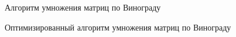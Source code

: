 \documentclass[12pt]{report}
\begin{document}
\newpage
\begin{figure}[h]
	\caption{Алгоритм умножения матриц по Винограду}
	\label{figure:image}
\end{figure}

\newpage
\begin{figure}[h]
	\caption{Оптимизированный алгоритм умножения матриц по Винограду}
	\label{figure:image}
\end{figure}
\end{document}
